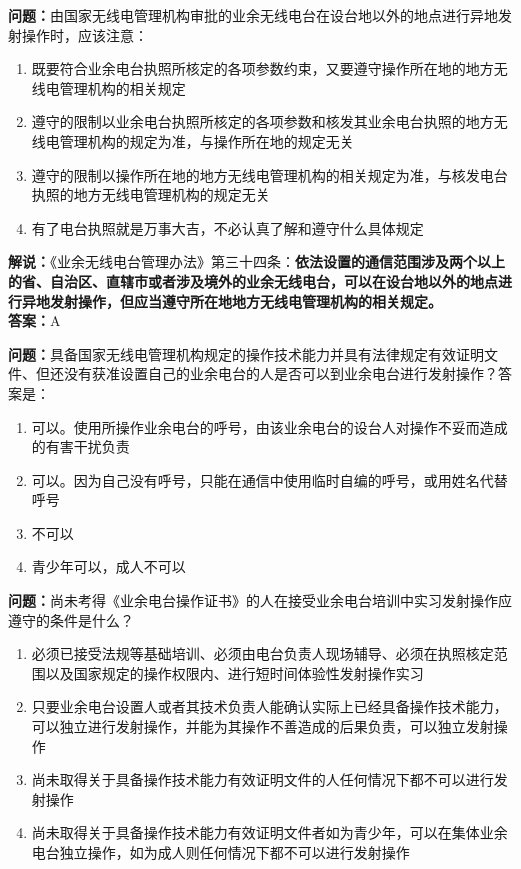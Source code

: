 \textbf{问题：}由国家无线电管理机构审批的业余无线电台在设台地以外的地点进行异地发射操作时，应该注意：
\begin{enumerate}[label=\Alph*), leftmargin=1cm]
	\item 既要符合业余电台执照所核定的各项参数约束，又要遵守操作所在地的地方无线电管理机构的相关规定
	\item 遵守的限制以业余电台执照所核定的各项参数和核发其业余电台执照的地方无线电管理机构的规定为准，与操作所在地的规定无关
	\item 遵守的限制以操作所在地的地方无线电管理机构的相关规定为准，与核发电台执照的地方无线电管理机构的规定无关
	\item 有了电台执照就是万事大吉，不必认真了解和遵守什么具体规定
\end{enumerate}
\textbf{解说：}《业余无线电台管理办法》第三十四条：\textbf{依法设置的通信范围涉及两个以上的省、自治区、直辖市或者涉及境外的业余无线电台，可以在设台地以外的地点进行异地发射操作，但应当遵守所在地地方无线电管理机构的相关规定。}\\\textbf{答案：}A

\textbf{问题：}具备国家无线电管理机构规定的操作技术能力并具有法律规定有效证明文件、但还没有获准设置自己的业余电台的人是否可以到业余电台进行发射操作？答案是：
\begin{enumerate}[label=\Alph*), leftmargin=1cm]
	\item 可以。使用所操作业余电台的呼号，由该业余电台的设台人对操作不妥而造成的有害干扰负责
	\item 可以。因为自己没有呼号，只能在通信中使用临时自编的呼号，或用姓名代替呼号
	\item 不可以
	\item 青少年可以，成人不可以
\end{enumerate}

\textbf{问题：}尚未考得《业余电台操作证书》的人在接受业余电台培训中实习发射操作应遵守的条件是什么？
\begin{enumerate}[label=\Alph*), leftmargin=1cm]
	\item 必须已接受法规等基础培训、必须由电台负责人现场辅导、必须在执照核定范围以及国家规定的操作权限内、进行短时间体验性发射操作实习
	\item 只要业余电台设置人或者其技术负责人能确认实际上已经具备操作技术能力，可以独立进行发射操作，并能为其操作不善造成的后果负责，可以独立发射操作
	\item 尚未取得关于具备操作技术能力有效证明文件的人任何情况下都不可以进行发射操作
	\item 尚未取得关于具备操作技术能力有效证明文件者如为青少年，可以在集体业余电台独立操作，如为成人则任何情况下都不可以进行发射操作
\end{enumerate}


